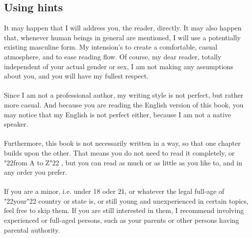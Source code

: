 \documentclass[12pt,a5paper]{article}
\newcommand{\q}[1]{\char"22{#1}\char"22 }
\begin{document}
	\newpage
	\subsection{Using hints}
		It may happen that I will address you,
		the reader,
		directly.
		It may also happen that,
		whenever human beings in general are mentioned,
		I will use a potentially existing masculine form.
		My intension's to create a 	comfortable,
		casual atmosphere,
		and to ease reading flow.
		Of course,
		my dear reader,
		totally independent of your actual gender or sex,
		I am not making any assumptions about you,
		and you will have my fullest respect.
		\\
		\\
		Since I am not a professional author,
		my writing style is not perfect,
		but rather more casual.
		And because you are reading the English version of this book,
		you may notice that my English is not perfect either,
		because I am not a native speaker.
		\\
		\\
		Furthermore,
		this book is not necessarily written in a way,
		so that one chapter builds upon the other.
		That means you do not need to read it completely,
		or \q{from A to Z},
		but you can read as much or as little as you like to,
		and in any order you prefer.
		\\
		\\
		If you are a minor,
		i.e. under 18 oder 21,
		or whatever the legal full-age of \q{your} country or state is,
		or still young and unexperienced in certain topics,
		feel free to skip them.
		If you are still interested in them,
		I recommend involving experienced or full-aged persons,
		such as your parents or other persons having parental authority.
	
	\newpage
\end{document}
